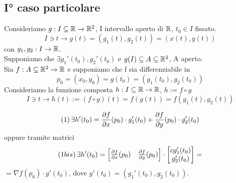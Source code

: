 \subsection{I° caso particolare}
Consideriamo $g : I \subseteq \mathbb{R} \to \mathbb{R}^2$, I intervallo aperto di $\mathbb{R}$, $t_0 \in I$ fissato. 
$$I \ni t \rightarrow g(t) = (g_1(t),g_2(t)) = (x(t),y(t))$$
con $g_1,g_2 : I \to \mathbb{R}$. \\
Supponiamo che $\exists g_1'(t_0), g_2'(t_0)$ e $g(I) \subseteq A \subseteq \mathbb{R}^2$, A aperto.\\
Sia $f: A \subseteq \mathbb{R}^2 \to \mathbb{R}$ e supponiamo che f sia differenziabile in $$p_0 = (x_0,y_0) = g(t_0) = (g_1(t_0),g_2(t_0))$$
Consideriamo la funzione composta $h: I \subseteq \mathbb{R} \to \mathbb{R}$, $h:= f\circ g$
$$I \ni t \rightarrow h(t) := (f\circ g)(t) = f(g(t))=f(g_1(t),g_2(t))$$
\begin{theorem}
  $$(1) \, \exists h'(t_0) = \frac{\partial f}{\partial x}(p_0) \cdot g_1'(t_0) + \frac{\partial f}{\partial y}(p_0) \cdot g_2'(t_0)$$
  oppure tramite matrici
  $$(1bis) \, \exists h'(t_0) =  \begin{bmatrix} \frac{\partial f}{\partial x}(p_0) & \frac{\partial f}{\partial y}(p_0) \end{bmatrix} \cdot \begin{bmatrix}{c}
    g_1'(t_0)\\
    g_2'(t_0)\\
  \end{bmatrix} = $$
  $= \nabla f(p_0)\cdot g'(t_0)$, dove $g'(t_0) = (g_1'(t_0), g_2(t_0))$.
\end{theorem}
